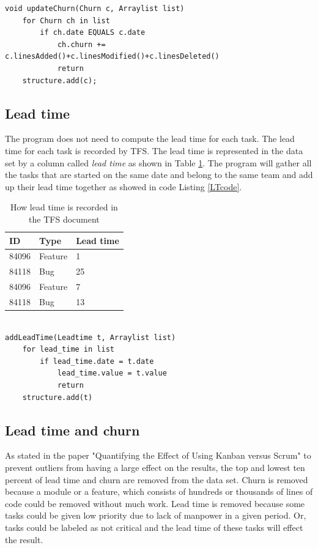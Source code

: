 \documentclass[UKenglish]{ifimaster}  %
\begin{document}
\begin{minipage}{\textwidth}
\begin{lstlisting}[caption=Pseudocode example of how throughput is measured, label=churnCode]
void updateChurn(Churn c, Arraylist list)
	for Churn ch in list
		if ch.date EQUALS c.date
			ch.churn += c.linesAdded()+c.linesModified()+c.linesDeleted()
			return
	structure.add(c);
\end{lstlisting}
 \end{minipage}
 


\subsection{Lead time}
\label{sec:LT}
The program does not need to compute  the lead time for each task. The lead time for each task is recorded by TFS. The lead time is represented in the data set by a column called \textit{lead time} as shown in Table \ref{table:LT}. The program will gather all the tasks that are started on the same date and belong to the same team and add up their lead time together as showed in code Listing \ref{LTcode}.   
\begin{table}[!ht]
\begin{center}
\caption{How lead time is recorded in the TFS document}
\begin{tabular}{ | l | l | l | }
\hline
	\bf{ID} & \bf{Type} & \bf{Lead time} \\ \hline
	84096 &  Feature  & 1 \\ \hline
	84118 &  Bug  & 25 \\ \hline
	84096 &  Feature  & 7 \\ \hline
	84118 &  Bug  & 13 \\ \hline
\end{tabular}
\label{table:LT} %
\end{center}
\end{table}

\begin{minipage}{\textwidth}
\begin{lstlisting}[caption=Pseudocode example of lead time is measured, label=LTcode]

addLeadTime(Leadtime t, Arraylist list)
	for lead_time in list
		if lead_time.date = t.date
			lead_time.value = t.value
			return
	structure.add(t)
\end{lstlisting}
\end{minipage}
\subsection{Lead time and churn}
As stated in the paper "Quantifying the Effect of Using Kanban versus Scrum" \parencite{Dag} to prevent outliers from having a large effect on the results, the top and lowest ten percent of lead time and churn are removed from the data set.
Churn is removed because a module or a feature, which consists of hundreds or thousands of lines of code could be removed without much work. Lead time is removed because some tasks could be given low priority due to lack of manpower in a given period. Or, tasks could be labeled as not critical and the lead time of these tasks will effect the result.
\end{document}
